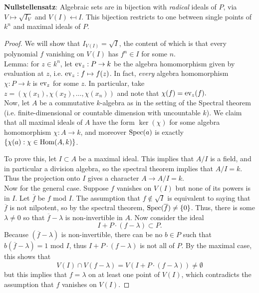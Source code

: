 \documentclass{amsart}
\begin{document}
\textbf{Nullstellensatz}: Algebraic sets are in bijection with \textit{radical} ideals of $P$, via $V \mapsto \sqrt{I_V}$ and $V(I) \mapsfrom I$. This bijection restricts to one between single points of $k^n$ and maximal ideals of $P$.
\begin{proof}
	We will show that $I_{V(I)}=\sqrt{I}$, the content of which is that every polynomial $f$ vanishing on $V(I)$ has $f^n\in I$ for some $n$.\\
	
	Lemma: for $z\in k^n$, let $\operatorname{ev}_z:P\to k$ be the algebra homomorphism given by evaluation at $z$, i.e. $\operatorname{ev}_z: f\mapsto f(z)$. In fact, \textit{every} algebra homomorphism $\chi: P\to k$ is $\operatorname{ev}_z$ for some $z$. In particular, take $z=(\chi(x_1),\chi(x_2),\dots,\chi(x_n))$ and note that $\chi(f) = \operatorname{ev}_z(f).$\\
	
	Now, let $A$ be a commutative $k$-algebra as in the setting of the Spectral theorem (i.e. finite-dimensional or countable dimension with uncountable $k$). We claim that all maximal ideals of $A$ have the form $\ker(\chi)$ for some algebra homomorphism $\chi: A \to k$, and moreover $\operatorname{Spec}(a)$ is exactly $\{\chi(a) : \chi\in \operatorname{Hom}(A,k)\}$.
	
	To prove this, let $I\subset A$ be a maximal ideal. This implies that $A/I$ is a field, and in particular a division algebra, so the spectral theorem implies that $A/I=k$. Thus the projection onto $I$ gives a character $A\to A/I=k$.\\
	
	Now for the general case. Suppose $f$ vanishes on $V(I)$ but none of its powers is in $I$. Let $\overline{f}$ be $f$ mod $I$. The assumption that $f\not\in \sqrt{I}$ is equivalent to saying that $\overline{f}$ is not nilpotent, so by the spectral theorem, $\operatorname{Spec}(\overline{f})\neq \{0\}$. Thus, there is some $\lambda\neq 0$ so that $\overline{f}-\lambda$ is non-invertible in $A$. Now consider the ideal
	$$
	I + P\cdot (f-\lambda) \subset P.
	$$
	Because $(\overline{f}-\lambda)$ is non-invertible, there can be no $b\in P$ such that $b(\overline{f}-\lambda)=1$ mod $I$, thus $I + P\cdot (f-\lambda)$ is not all of $P$. By the maximal case, this shows that 
	$$
	V(I)\cap V(f-\lambda) = V(I+P\cdot (f-\lambda)) \neq \emptyset 
	$$
	but this implies that $f=\lambda$ on at least one point of $V(I)$, which contradicts the assumption that $f$ vanishes on $V(I)$.
\end{proof}\\
\end{document}
